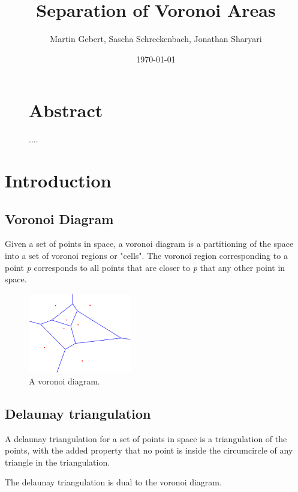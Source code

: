 \documentclass[a4paper,12pt]{article}
\title{\textbf{Separation of Voronoi Areas}}
\author{Martin Gebert, Sascha Schreckenbach, Jonathan Sharyari}  %
\date{\today}
\begin{document}
\maketitle

\begin{figure}
\section*{\large Abstract}
....
\end{figure}
\newpage

\section{Introduction}
\subsection{Voronoi Diagram}
Given a set of points in space, a voronoi diagram is a partitioning of the space into a set of voronoi regions or "cells". The voronoi region corresponding to a point \emph{p} corresponds to all points that are closer to \emph{p} that any other point in space.

\begin{figure}[hb]
\centering
\includegraphics[width=0.4\textwidth]{pictures/Voronoi-diagram.png}
 \caption[Close up of \textit{Hemidactylus} sp.]
{A voronoi diagram.}
\end{figure}

\subsection{Delaunay triangulation}
A delaunay triangulation for a set of points in space is a triangulation of the points, with the added property that no point is inside the circumcircle of any triangle in the triangulation.

The delaunay triangulation is dual to the voronoi diagram.
\end{document}
